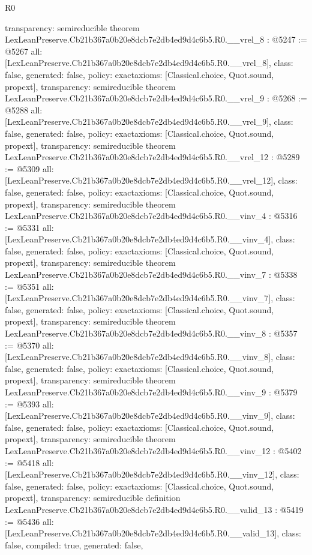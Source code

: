 \begin{lexlean}{R0}
\begin{coremodule}
{  transparency: semireducible
}
theorem LexLeanPreserve.Cb21b367a0b20e8dcb7e2db4ed9d4c6b5.R0.__vrel_8 : @5247 := @5267 {
  all: [LexLeanPreserve.Cb21b367a0b20e8dcb7e2db4ed9d4c6b5.R0.__vrel_8],
  class: false,
  generated: false,
  policy: exact{axioms: [Classical.choice, Quot.sound, propext]},
  transparency: semireducible
}
theorem LexLeanPreserve.Cb21b367a0b20e8dcb7e2db4ed9d4c6b5.R0.__vrel_9 : @5268 := @5288 {
  all: [LexLeanPreserve.Cb21b367a0b20e8dcb7e2db4ed9d4c6b5.R0.__vrel_9],
  class: false,
  generated: false,
  policy: exact{axioms: [Classical.choice, Quot.sound, propext]},
  transparency: semireducible
}
theorem LexLeanPreserve.Cb21b367a0b20e8dcb7e2db4ed9d4c6b5.R0.__vrel_12 : @5289 := @5309 {
  all: [LexLeanPreserve.Cb21b367a0b20e8dcb7e2db4ed9d4c6b5.R0.__vrel_12],
  class: false,
  generated: false,
  policy: exact{axioms: [Classical.choice, Quot.sound, propext]},
  transparency: semireducible
}
theorem LexLeanPreserve.Cb21b367a0b20e8dcb7e2db4ed9d4c6b5.R0.__vinv_4 : @5316 := @5331 {
  all: [LexLeanPreserve.Cb21b367a0b20e8dcb7e2db4ed9d4c6b5.R0.__vinv_4],
  class: false,
  generated: false,
  policy: exact{axioms: [Classical.choice, Quot.sound, propext]},
  transparency: semireducible
}
theorem LexLeanPreserve.Cb21b367a0b20e8dcb7e2db4ed9d4c6b5.R0.__vinv_7 : @5338 := @5351 {
  all: [LexLeanPreserve.Cb21b367a0b20e8dcb7e2db4ed9d4c6b5.R0.__vinv_7],
  class: false,
  generated: false,
  policy: exact{axioms: [Classical.choice, Quot.sound, propext]},
  transparency: semireducible
}
theorem LexLeanPreserve.Cb21b367a0b20e8dcb7e2db4ed9d4c6b5.R0.__vinv_8 : @5357 := @5370 {
  all: [LexLeanPreserve.Cb21b367a0b20e8dcb7e2db4ed9d4c6b5.R0.__vinv_8],
  class: false,
  generated: false,
  policy: exact{axioms: [Classical.choice, Quot.sound, propext]},
  transparency: semireducible
}
theorem LexLeanPreserve.Cb21b367a0b20e8dcb7e2db4ed9d4c6b5.R0.__vinv_9 : @5379 := @5393 {
  all: [LexLeanPreserve.Cb21b367a0b20e8dcb7e2db4ed9d4c6b5.R0.__vinv_9],
  class: false,
  generated: false,
  policy: exact{axioms: [Classical.choice, Quot.sound, propext]},
  transparency: semireducible
}
theorem LexLeanPreserve.Cb21b367a0b20e8dcb7e2db4ed9d4c6b5.R0.__vinv_12 : @5402 := @5418 {
  all: [LexLeanPreserve.Cb21b367a0b20e8dcb7e2db4ed9d4c6b5.R0.__vinv_12],
  class: false,
  generated: false,
  policy: exact{axioms: [Classical.choice, Quot.sound, propext]},
  transparency: semireducible
}
definition LexLeanPreserve.Cb21b367a0b20e8dcb7e2db4ed9d4c6b5.R0.__valid_13 : @5419 := @5436 {
  all: [LexLeanPreserve.Cb21b367a0b20e8dcb7e2db4ed9d4c6b5.R0.__valid_13],
  class: false,
  compiled: true,
  generated: false,
}
\end{coremodule}
\end{lexlean}
